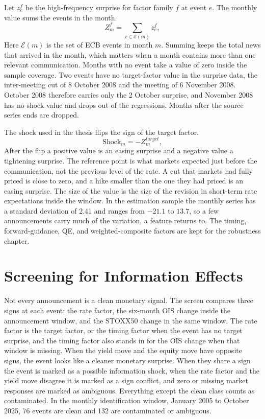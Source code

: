 Let \(z^{f}_{e}\) be the high-frequency surprise for factor family \(f\) at event \(e\). The monthly value sums the events in the month.
\begin{equation}
  Z^{f}_{m}
  =
  \sum_{e \in \mathcal{E}(m)} z^{f}_{e},
  \label{eq:monthly-shock-aggregation}
\end{equation}
Here \(\mathcal{E}(m)\) is the set of ECB events in month \(m\). Summing keeps the total news that arrived in the month, which matters when a month contains more than one relevant communication. Months with no event take a value of zero inside the sample coverage. Two events have no target-factor value in the surprise data, the inter-meeting cut of 8 October 2008 and the meeting of 6 November 2008. October 2008 therefore carries only the 2 October surprise, and November 2008 has no shock value and drops out of the regressions. Months after the source series ends are dropped.

The shock used in the thesis flips the sign of the target factor.
\begin{equation}
  \mathrm{Shock}_{m}
  =
  - Z^{target}_{m},
  \label{eq:target-easing-sign}
\end{equation}
After the flip a positive value is an easing surprise and a negative value a tightening surprise. The reference point is what markets expected just before the communication, not the previous level of the rate. A cut that markets had fully priced is close to zero, and a hike smaller than the one they had priced is an easing surprise. The size of the value is the size of the revision in short-term rate expectations inside the window. In the estimation sample the monthly series has a standard deviation of 2.41 and ranges from \(-21.1\) to \(13.7\), so a few announcements carry much of the variation, a feature  returns to. The timing, forward-guidance, QE, and weighted-composite factors are kept for the robustness chapter.

\section{Screening for Information Effects}
\label{sec:information-screen}

Not every announcement is a clean monetary signal. The screen compares three signs at each event: the rate factor, the six-month OIS change inside the announcement window, and the STOXX50 change in the same window. The rate factor is the target factor, or the timing factor when the event has no target surprise, and the timing factor also stands in for the OIS change when that window is missing. When the yield move and the equity move have opposite signs, the event looks like a cleaner monetary surprise. When they share a sign the event is marked as a possible information shock, when the rate factor and the yield move disagree it is marked as a sign conflict, and zero or missing market responses are marked as ambiguous. Everything except the clean class counts as contaminated. In the monthly identification window, January 2005 to October 2025, 76 events are clean and 132 are contaminated or ambiguous.

